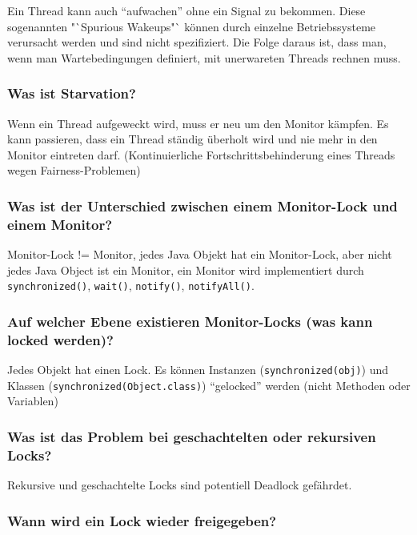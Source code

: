 \documentclass[10pt,a4paper]{scrartcl}
\begin{document}
Ein Thread kann auch "`aufwachen"' ohne ein Signal zu bekommen. Diese sogenannten "`Spurious
Wakeups"` können durch einzelne Betriebssysteme verursacht werden und sind nicht spezifiziert. Die
Folge daraus ist, dass man, wenn man Wartebedingungen definiert, mit unerwareten Threads rechnen
muss.
  
\subsubsection{Was ist Starvation?}

Wenn ein Thread aufgeweckt wird, muss er neu um den Monitor kämpfen. Es kann passieren, dass ein
Thread ständig überholt wird und nie mehr in den Monitor eintreten darf. (Kontinuierliche
Fortschrittsbehinderung eines Threads wegen Fairness-Problemen)
  
\subsubsection{Was ist der Unterschied zwischen einem Monitor-Lock und einem Monitor?}

Monitor-Lock != Monitor, jedes Java Objekt hat ein Monitor-Lock, aber nicht jedes Java Object ist
ein Monitor, ein Monitor wird implementiert durch \texttt{synchronized()}, \texttt{wait()},
\texttt{notify()}, \texttt{notifyAll()}.
  
\subsubsection{Auf welcher Ebene existieren Monitor-Locks (was kann locked werden)?}

\begin{sloppypar}  %
Jedes Objekt hat einen Lock. Es können Instanzen (\texttt{synchronized(obj)}) und Klassen
(\texttt{synchronized(Object.class)}) "`gelocked"' werden (nicht Methoden oder Variablen)
\end{sloppypar}
  
\subsubsection{Was ist das Problem bei geschachtelten oder rekursiven Locks?}

Rekursive und geschachtelte Locks sind potentiell Deadlock gefährdet.
  
\subsubsection{Wann wird ein Lock wieder freigegeben?}
\end{document}
